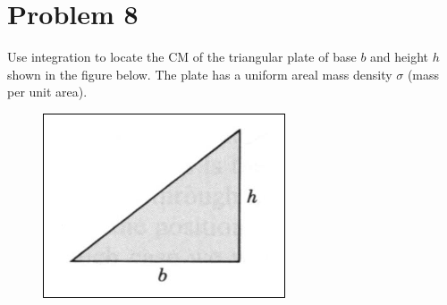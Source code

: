 \documentclass{article}
\begin{document}
\section*{Problem 8}
Use integration to locate the CM of the triangular plate of base $b$ and height $h$ shown in the figure below.
The plate has a uniform areal mass density $\sigma$ (mass per unit area).

\begin{figure}[ht]
    \centering
    \includegraphics[scale=.5]{drawing-4.png}
\end{figure}
\end{document}
